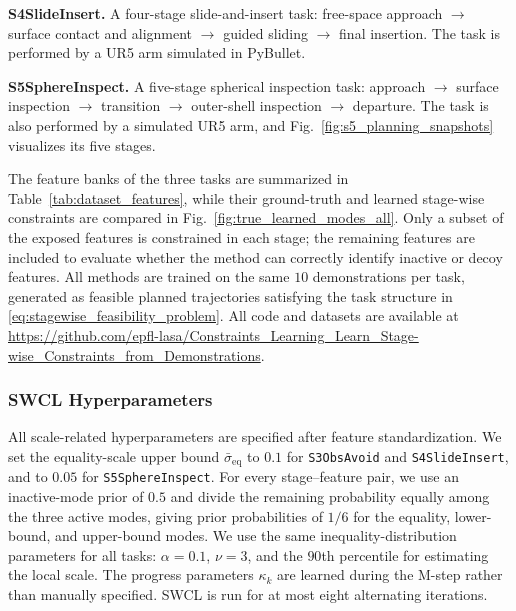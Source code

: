 \documentclass[lettersize,journal]{IEEEtran}
\begin{document}
\textbf{S4SlideInsert.} A four-stage slide-and-insert task: free-space approach $\rightarrow$ surface contact and alignment $\rightarrow$ guided sliding $\rightarrow$ final insertion.
The task is performed by a UR5 arm simulated in PyBullet.

\textbf{S5SphereInspect.} A five-stage spherical inspection task: approach $\rightarrow$ surface inspection $\rightarrow$ transition $\rightarrow$ outer-shell inspection $\rightarrow$ departure.
The task is also performed by a simulated UR5 arm, and Fig.~\ref{fig:s5_planning_snapshots} visualizes its five stages.

The feature banks of the three tasks are summarized in Table~\ref{tab:dataset_features}, while their ground-truth and learned stage-wise constraints are compared in Fig.~\ref{fig:true_learned_modes_all}. Only a subset of the exposed features is constrained in each stage; the remaining features are included to evaluate whether the method can correctly identify inactive or decoy features. All methods are trained on the same
$10$ demonstrations per task, generated as feasible planned trajectories satisfying the task structure in
\eqref{eq:stagewise_feasibility_problem}. All code and datasets are available at
\url{https://github.com/epfl-lasa/Constraints_Learning_Learn_Stage-wise_Constraints_from_Demonstrations}.

\subsubsection{SWCL Hyperparameters}

All scale-related hyperparameters are specified after feature standardization. We set the equality-scale upper bound $\bar{\sigma}_{\mathrm{eq}}$ to $0.1$ for \texttt{S3ObsAvoid} and \texttt{S4SlideInsert}, and to $0.05$ for \texttt{S5SphereInspect}. For every stage--feature pair, we use an inactive-mode prior of $0.5$ and divide the remaining probability equally among the three active modes, giving prior probabilities of $1/6$ for the equality, lower-bound, and upper-bound modes. We use the same inequality-distribution parameters for all tasks: $\alpha=0.1$, $\nu=3$, and the $90$th percentile for estimating the local scale. The progress parameters $\kappa_k$ are learned during the M-step rather than manually specified. SWCL is run for at most eight alternating iterations.



\end{document}
